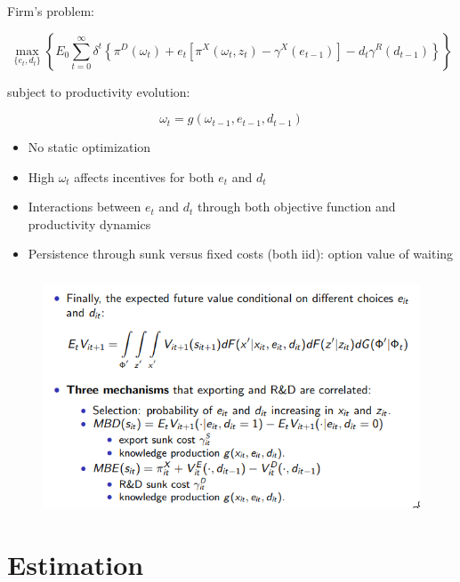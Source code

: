\documentclass[c, dvipsnames]{beamer}  %
\begin{document}
\begin{frame}[shrink=3]
\frametitle{\insertsection} 


Firm’s problem:


$$ \max_{\{e_{t},d_{t}\}} \left\{ E_0 \sum^\infty_{t=0} \delta^t \left\{ \pi^D(\omega_t) +e_t [\pi^X(\omega_t,z_t)-\gamma^X(e_{t-1})] -d_t\gamma^R(d_{t-1})\right\}\right\}$$

subject to productivity evolution:

$$\omega_t = g(\omega_{t−1}, e_{t−1}, d_{t−1})$$


\begin{itemize}
	\item No static optimization
\item 
High $\omega_t$ affects incentives for both $e_t$ and $d_t$
\item 
Interactions between $e_t$ and $d_t$ through both objective
function and productivity dynamics
\item 
Persistence through sunk versus fixed costs (both iid): option
value of waiting


\end{itemize}
\end{frame}



\begin{frame}[shrink=3]
\frametitle{\insertsection} 


\begin{figure}
	\centering
	\includegraphics[width=0.7\linewidth]{screenshot005}
	
	
	\label{fig:screenshot005}
\end{figure}



\end{frame}








\section{Estimation}
\end{document}
